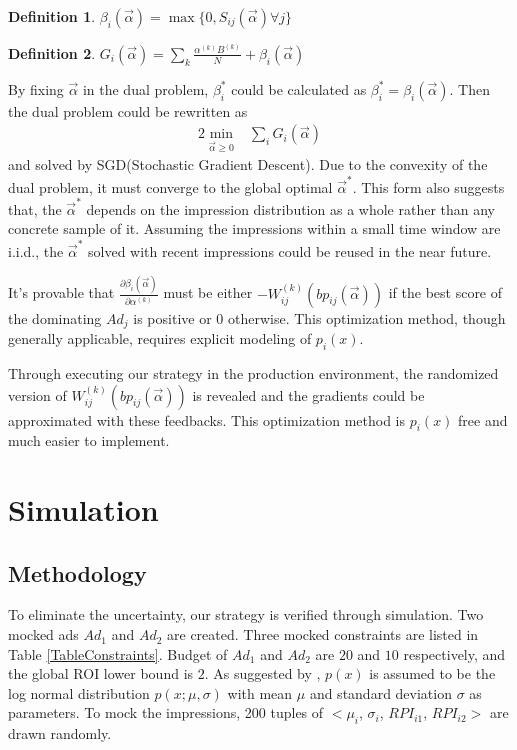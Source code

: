 \documentclass{article}
\newtheorem{definition}{Definition}[section]
\newcommand{\sbp}{bp_{ij}}
\newcommand{\sW}{W_{ij}^{(k)}}
\newcommand{\sB}{B^{(k)}}
\newcommand{\salpha}{\alpha^{(k)}}
\newcommand{\sbeta}{\beta_i}
\newcommand{\sS}{S_{ij}}
\newcommand{\sG}{G_i}
\newcommand{\valpha}{\vec{\alpha}}
\begin{document}
\begin{definition}
$\sbeta(\valpha) = \max \{ 0, \sS(\valpha) \forall j \}$
\end{definition}

\begin{definition}
$\sG(\valpha) = \sum\limits_k \frac{\salpha \sB}{N} + \sbeta(\valpha)$
\end{definition}

By fixing $\valpha$ in the dual problem, $\sbeta^*$ could be calculated as $\sbeta^* = \sbeta(\valpha)$.
Then the dual problem could be rewritten as
\begin{alignat}{2}
\min\limits_{\valpha \ge 0} & \sum\limits_i \sG(\valpha)
\end{alignat}
    and solved by SGD(Stochastic Gradient Descent).
Due to the convexity of the dual problem, it must converge to the global optimal $\valpha^*$.
This form also suggests that, the $\valpha^*$ depends on the impression distribution as a whole
    rather than any concrete sample of it.
Assuming the impressions within a small time window are i.i.d.,
    the $\valpha^*$ solved with recent impressions could be reused in the near future.

It's provable that $\frac{\partial\sbeta(\valpha)}{\partial\salpha}$ must be
    either $-\sW(\sbp(\valpha))$ if the best score of the dominating $Ad_j$ is positive or $0$ otherwise.
This optimization method, though generally applicable, requires explicit modeling of $p_i(x)$.

Through executing our strategy in the production environment, the randomized version of $\sW(\sbp(\valpha))$ is revealed
    and the gradients could be approximated with these feedbacks.
This optimization method is $p_i(x)$ free and much easier to implement.

\section{Simulation} \label{Simulation}

\subsection{Methodology}

To eliminate the uncertainty, our strategy is verified through simulation.
Two mocked ads $Ad_1$ and $Ad_2$ are created.
Three mocked constraints are listed in Table \ref{TableConstraints}.
Budget of $Ad_1$ and $Ad_2$ are $20$ and $10$ respectively, and the global ROI lower bound is $2$.
As suggested by \cite{YingCui2011}, $p(x)$ is assumed to be the log normal distribution $p(x;\mu,\sigma)$
    with mean $\mu$ and standard deviation $\sigma$ as parameters.
To mock the impressions, 200 tuples of $<\mu_i$, $\sigma_i$, $RPI_{i1}$, $RPI_{i2}>$ are drawn randomly.
\end{document}
